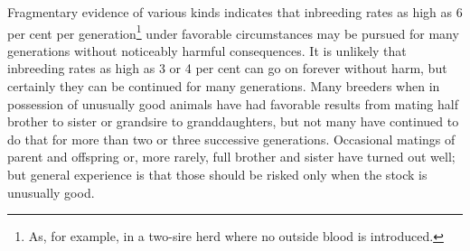 Fragmentary evidence of various kinds indicates that inbreeding
rates as high as 6 per cent per generation\footnote{As, for example,
in a two-sire herd where no outside blood is introduced.} under favorable
circumstances may be pursued for many generations without noticeably
harmful consequences. It is unlikely that inbreeding rates as high as 3 or 4
per cent can go on forever without harm, but certainly they can be continued
for many generations. Many breeders when in possession of
unusually good animals have had favorable results from mating half
brother to sister or grandsire to granddaughters, but not many have
continued to do that for more than two or three successive generations.
Occasional matings of parent and offspring or, more rarely, full brother
and sister have turned out well; but general experience is that those
should be risked only when the stock is unusually good.

